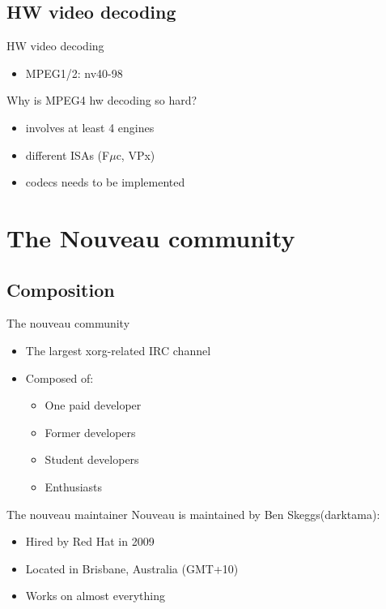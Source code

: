 \documentclass[11pt,english,compress]{beamer}
\begin{document}
	\subsection{HW video decoding}
		\begin{frame}
			\begin{block}{HW video decoding}
				\begin{itemize}
					\item MPEG1/2: nv40-98
				\end{itemize}
			\end{block}

			\begin{block}{Why is MPEG4 hw decoding so hard?}
				\begin{itemize}
					\item involves at least 4 engines
					\item different ISAs (F$\mu$c, VPx)
					\item codecs needs to be implemented
				\end{itemize}
			\end{block}
		\end{frame}

\section{The Nouveau community}
	\subsection{Composition}
		\begin{frame}
			\begin{block}{The nouveau community}
				\begin{itemize}
					\item The largest xorg-related IRC channel
					\item Composed of:
						\begin{itemize}
							\item One paid developer
							\item Former developers
							\item Student developers
							\item Enthusiasts
						\end{itemize}
				\end{itemize}
			\end{block}

			\begin{block}{The nouveau maintainer}
				Nouveau is maintained by Ben Skeggs(darktama):
				\begin{itemize}
					\item Hired by Red Hat in 2009
					\item Located in Brisbane, Australia (GMT+10)
					\item Works on almost everything
				\end{itemize}
			\end{block}
		\end{frame}
\end{document}
